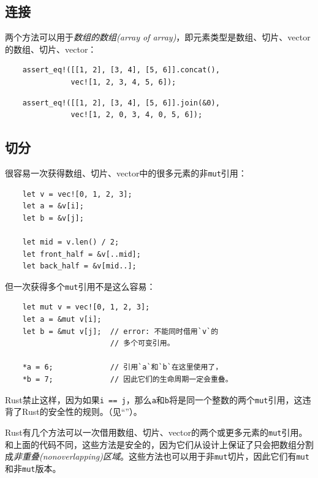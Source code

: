 \subsection{连接}
两个方法可以用于\emph{数组的数组(array of array)}，即元素类型是数组、切片、vector的数组、切片、vector：

\begin{verbatim}
    assert_eq!([[1, 2], [3, 4], [5, 6]].concat(),
               vec![1, 2, 3, 4, 5, 6]);
\end{verbatim}

\begin{verbatim}
    assert_eq!([[1, 2], [3, 4], [5, 6]].join(&0),
               vec![1, 2, 0, 3, 4, 0, 5, 6]);
\end{verbatim}

\subsection{切分}\label{split}
很容易一次获得数组、切片、vector中的很多元素的非\texttt{mut}引用：
\begin{verbatim}
    let v = vec![0, 1, 2, 3];
    let a = &v[i];
    let b = &v[j];

    let mid = v.len() / 2;
    let front_half = &v[..mid];
    let back_half = &v[mid..];
\end{verbatim}

但一次获得多个\texttt{mut}引用不是这么容易：
\begin{verbatim}
    let mut v = vec![0, 1, 2, 3];
    let a = &mut v[i];
    let b = &mut v[j];  // error: 不能同时借用`v`的
                        // 多个可变引用。

    *a = 6;             // 引用`a`和`b`在这里使用了，
    *b = 7;             // 因此它们的生命周期一定会重叠。
\end{verbatim}

Rust禁止这样，因为如果\texttt{i == j}，那么\texttt{a}和\texttt{b}将是同一个整数的两个\texttt{mut}引用，这违背了Rust的安全性的规则。（见“”）。

Rust有几个方法可以一次借用数组、切片、vector的两个或更多元素的\texttt{mut}引用。和上面的代码不同，这些方法是安全的，因为它们从设计上保证了只会把数组分割成\emph{非重叠(nonoverlapping)区域}。这些方法也可以用于非\texttt{mut}切片，因此它们有\texttt{mut}和非\texttt{mut}版本。

